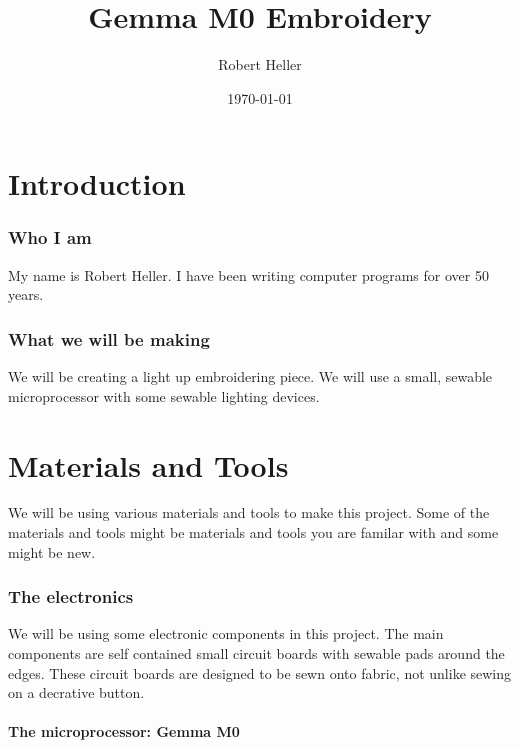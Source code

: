\documentclass[letterpaper,twoside,12pt]{article}
\title{Gemma M0 Embroidery}
\author{Robert Heller}
\date{\today}
\begin{document}
\maketitle

\tableofcontents

\part{Introduction}
\section{Who I am}

My name is Robert Heller.  I have been writing computer programs for over 50
years.

\section{What we will be making}

We will be creating a light up embroidering piece.  We will use a small, 
sewable microprocessor with some sewable lighting devices.

\part{Materials and Tools}

We will be using various materials and tools to make this project.  Some of 
the materials and tools might be materials and tools you are familar with and 
some might be new.

\section{The electronics}

We will be using some electronic components in this project.  The main 
components are self contained small circuit boards with sewable pads around 
the edges.  These circuit boards are designed to be sewn onto fabric, not 
unlike sewing on a decrative button.

\subsection{The microprocessor: Gemma M0}
\end{document}
